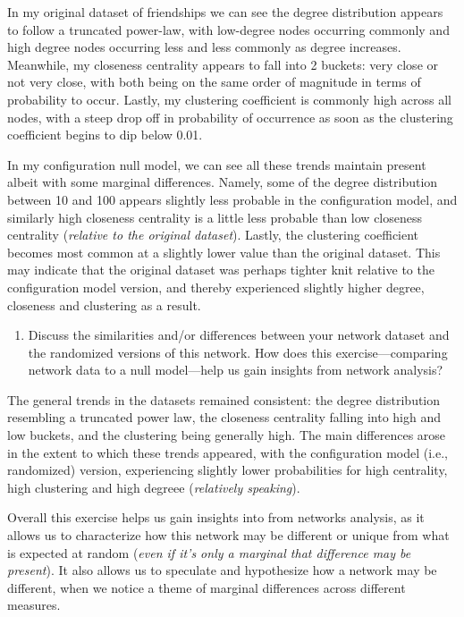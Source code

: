 \documentclass[11pt]{article}
\providecommand{\tightlist}{%
      \setlength{\itemsep}{0pt}\setlength{\parskip}{0pt}}
\begin{document}
    In my original dataset of friendships we can see the degree distribution
appears to follow a truncated power-law, with low-degree nodes occurring
commonly and high degree nodes occurring less and less commonly as
degree increases. Meanwhile, my closeness centrality appears to fall
into 2 buckets: very close or not very close, with both being on the
same order of magnitude in terms of probability to occur. Lastly, my
clustering coefficient is commonly high across all nodes, with a steep
drop off in probability of occurrence as soon as the clustering
coefficient begins to dip below 0.01.

In my configuration null model, we can see all these trends maintain
present albeit with some marginal differences. Namely, some of the
degree distribution between 10 and 100 appears slightly less probable in
the configuration model, and similarly high closeness centrality is a
little less probable than low closeness centrality (\emph{relative to
the original dataset}). Lastly, the clustering coefficient becomes most
common at a slightly lower value than the original dataset. This may
indicate that the original dataset was perhaps tighter knit relative to
the configuration model version, and thereby experienced slightly higher
degree, closeness and clustering as a result.

    \begin{enumerate}
\def\labelenumi{(\alph{enumi})}
\setcounter{enumi}{2}
\tightlist
\item
  Discuss the similarities and/or differences between your network
  dataset and the randomized versions of this network. How does this
  exercise---comparing network data to a null model---help us gain
  insights from network analysis?
\end{enumerate}

    The general trends in the datasets remained consistent: the degree
distribution resembling a truncated power law, the closeness centrality
falling into high and low buckets, and the clustering being generally
high. The main differences arose in the extent to which these trends
appeared, with the configuration model (i.e., randomized) version,
experiencing slightly lower probabilities for high centrality, high
clustering and high degreee (\emph{relatively speaking}).

Overall this exercise helps us gain insights into from networks
analysis, as it allows us to characterize how this network may be
different or unique from what is expected at random (\emph{even if it's
only a marginal that difference may be present}). It also allows us to
speculate and hypothesize how a network may be different, when we notice
a theme of marginal differences across different measures.
\end{document}
